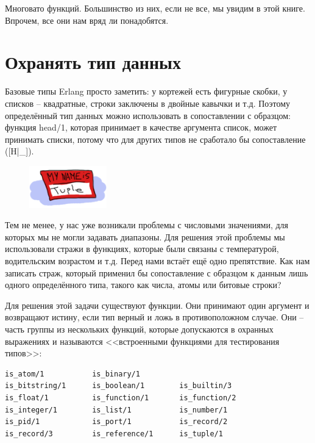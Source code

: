 \documentclass[a4paper,12pt]{report}
\newcommand{\ops}{\colorbox{lgreen}}
\begin{document}
Многовато функций. Большинство из них, если не все, мы увидим в этой книге. Впрочем, все они нам вряд ли понадобятся.
\section{Охранять тип данных}
Базовые типы Erlang просто заметить: у кортежей есть фигурные скобки, у списков \--- квадратные, строки заключены в двойные кавычки и т.д. Поэтому определённый тип данных можно использовать в сопоставлении с образцом: функция \ops{head/1}, которая принимает в качестве аргумента список, может принимать списки, потому что для других типов не сработало бы сопоставление (\ops{[H|\_]}).
\begin{figure}[h!]
    \includegraphics[width=0.3\textwidth]{my-name-is.png}
\end{figure} 

Тем не менее, у нас уже возникали проблемы с числовыми значениями, для которых мы не могли задавать диапазоны. Для решения этой проблемы мы использовали стражи в функциях, которые были связаны с температурой, водительским возрастом и т.д. Перед нами встаёт ещё одно препятствие. Как нам записать страж, который применил бы сопоставление с образцом к данным лишь одного определённого типа, такого как числа, атомы или битовые строки?

Для решения этой задачи существуют функции. Они принимают один аргумент и возвращают истину, если тип верный и ложь в противоположном случае. Они \--- часть группы из нескольких функций, которые допускаются в охранных выражениях и называются <<встроенными функциями для тестирования типов>>:
\begin{lstlisting}[style=erlang]
is_atom/1           is_binary/1        
is_bitstring/1      is_boolean/1        is_builtin/3       
is_float/1          is_function/1       is_function/2      
is_integer/1        is_list/1           is_number/1        
is_pid/1            is_port/1           is_record/2        
is_record/3         is_reference/1      is_tuple/1        
\end{lstlisting}
\end{document}
